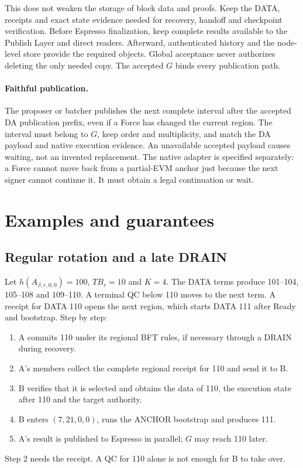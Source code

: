 \documentclass[11pt,a4paper]{article}
\newcommand{\TB}{\mathit{TB}}
\begin{document}
This does not weaken the storage of block data and proofs. Keep the DATA,
receipts and exact state evidence needed for recovery, handoff and
checkpoint verification. Before Espresso finalization, keep complete
results available to the Publish Layer and direct readers. Afterward,
authenticated history and the node-level store provide the required
objects. Global acceptance never authorizes deleting the only needed
copy. The accepted $G$ binds every publication path.

\paragraph{Faithful publication.}
The proposer or batcher publishes the next complete interval after
the accepted DA publication prefix, even if a Force has changed the current region. The
interval must belong to $G$, keep order and multiplicity, and match the DA
payload and native execution evidence. An unavailable accepted payload
causes waiting, not an invented replacement. The native adapter is
specified separately: a Force cannot move back from a partial-EVM anchor
just because the next signer cannot continue it. It must obtain a legal
continuation or wait.

\section{Examples and guarantees}
\label{sec:examples}
\subsection{Regular rotation and a late DRAIN}
\label{sec:regular-example}
Let $h(A_{\beta,r,0,0})=100$, $\TB_r=10$ and $K=4$. The DATA terms produce
101--104, 105--108 and 109--110. A terminal QC below 110 moves to the next
term. A receipt for DATA 110 opens the next region, which starts DATA 111
after Ready and bootstrap. Step by step:
\begin{enumerate}
\item A commits 110 under its regional BFT rules, if necessary through a
DRAIN during recovery.
\item A's members collect the complete regional receipt for 110 and send
it to B.
\item B verifies that it is selected and obtains the data of 110, the
execution state after 110 and the target authority.
\item B enters $(7,21,0,0)$, runs the ANCHOR bootstrap and produces 111.
\item A's result is published to Espresso in parallel; $G$ may reach 110
later.
\end{enumerate}
Step 2 needs the receipt. A QC for 110 alone is not enough for B to take
over.
\end{document}
